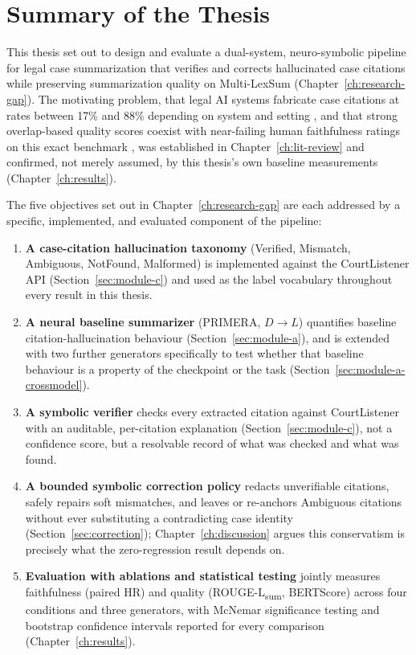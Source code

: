 \label{ch:conclusion}

\section{Summary of the Thesis}
\label{sec:conc-summary}

This thesis set out to design and evaluate a dual-system, neuro-symbolic pipeline for legal case summarization that verifies and corrects hallucinated case citations while preserving summarization quality on Multi-LexSum (Chapter~\ref{ch:research-gap}). The motivating problem, that legal AI systems fabricate case citations at rates between 17\% and 88\% depending on system and setting \cite{dahl2024largelegalfictions,magesh2025hallucinationfree}, and that strong overlap-based quality scores coexist with near-failing human faithfulness ratings on this exact benchmark \cite{shen2022multilexsum}, was established in Chapter~\ref{ch:lit-review} and confirmed, not merely assumed, by this thesis's own baseline measurements (Chapter~\ref{ch:results}).

The five objectives set out in Chapter~\ref{ch:research-gap} are each addressed by a specific, implemented, and evaluated component of the pipeline:

\begin{enumerate}
  \item \textbf{A case-citation hallucination taxonomy} (Verified, Mismatch, Ambiguous, NotFound, Malformed) is implemented against the CourtListener API (Section~\ref{sec:module-c}) and used as the label vocabulary throughout every result in this thesis.
  \item \textbf{A neural baseline summarizer} (PRIMERA, $D\rightarrow L$) quantifies baseline citation-hallucination behaviour (Section~\ref{sec:module-a}), and is extended with two further generators specifically to test whether that baseline behaviour is a property of the checkpoint or the task (Section~\ref{sec:module-a-crossmodel}).
  \item \textbf{A symbolic verifier} checks every extracted citation against CourtListener with an auditable, per-citation explanation (Section~\ref{sec:module-c}), not a confidence score, but a resolvable record of what was checked and what was found.
  \item \textbf{A bounded symbolic correction policy} redacts unverifiable citations, safely repairs soft mismatches, and leaves or re-anchors Ambiguous citations without ever substituting a contradicting case identity (Section~\ref{sec:correction}); Chapter~\ref{ch:discussion} argues this conservatism is precisely what the zero-regression result depends on.
  \item \textbf{Evaluation with ablations and statistical testing} jointly measures faithfulness (paired HR) and quality (ROUGE-L\textsubscript{sum}, BERTScore) across four conditions and three generators, with McNemar significance testing and bootstrap confidence intervals reported for every comparison (Chapter~\ref{ch:results}).
\end{enumerate}

